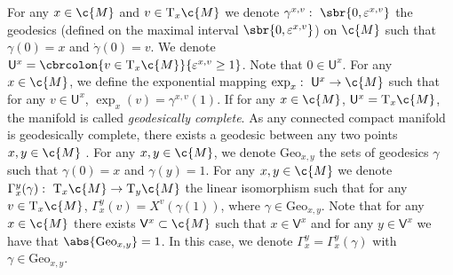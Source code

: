 For any \(x \in \c{M}\) and \(v \in \mathrm{T}_x \c{M}\) we denote \(\gamma^{x,v}: \ \sbr{0,\varepsilon^{x,v}}\) the geodesics (defined on the maximal interval \(\sbr{0, \varepsilon^{x,v}}\)) on \(\c{M}\) such that \(\gamma(0) = x\) and \(\dot \gamma(0) = v\).
We denote \(\mathsf{U}^x = \cbrcolon{v \in \mathrm{T}_x \c{M}}{\varepsilon^{x,v} \geq 1}\).
Note that \(0 \in \mathsf{U}^x\).
For any \(x \in \c{M}\), we define the exponential mapping \(\exp_x: \ \mathsf{U}^x \to \c{M}\) such that for any \(v \in \mathsf{U}^x\), \(\exp_x(v) = \gamma^{x,v}(1)\).
If for any \(x \in \c{M}\), \(\mathsf{U}^x = \mathrm{T}_x \c{M}\), the manifold is called \emph{geodesically complete}.
As any connected compact manifold is geodesically complete, there exists a geodesic between any two points \(x, y \in \c{M}\) \cite[see][Lemma 6.18]{lee2018introduction}.
For any \(x, y \in \c{M}\), we denote \(\mathrm{Geo}_{x,y}\) the sets of geodesics \(\gamma\) such that \(\gamma(0) = x\) and \(\gamma(y) = 1\).
For any \(x, y \in \c{M}\) we denote \(\Gamma_x^y(\gamma) : \ \mathrm{T}_x \c{M} \to \mathrm{T}_y \c{M}\) the linear isomorphism such that for any \(v \in \mathrm{T}_x \c{M}\), \(\Gamma_x^y(v) = X^v(\gamma(1))\), where \(\gamma \in \mathrm{Geo}_{x,y}\).
Note that for any \(x \in \c{M}\) there exists \(\mathsf{V}^x \subset \c{M}\) such that \(x \in \mathsf{V}^x\) and for any \(y \in \mathsf{V}^x\) we have that \(\abs{\mathrm{Geo}_{x,y}}=1\).
In this case, we denote \(\Gamma_x^y = \Gamma_x^y(\gamma)\) with \(\gamma \in \mathrm{Geo}_{x,y}\).

